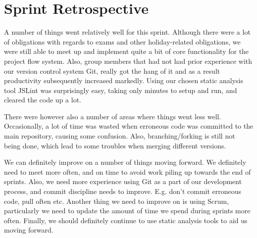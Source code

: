\section{Sprint Retrospective} %
\label{sec:Sprint Retrospective}

A number of things went relatively well for this sprint. Although there were a lot of obligations with regards to exams and other holiday-related obligations, we were still able to meet up and implement quite a bit of core functionality for the project flow system. Also, group members that had not had prior experience with our version control system Git, really got the hang of it and as a result productivity subsequently increased markedly. Using our chosen static analysis tool JSLint was surprisingly easy, taking only minutes to setup and run, and cleared the code up a lot. 

There were however also a number of areas where things went less well. Occasionally, a lot of time was wasted when erroneous code was committed to the main repository, causing some confusion. Also, branching/forking is still not being done, which lead to some troubles when merging different versions.

We can definitely improve on a number of things moving forward. We definitely need to meet more often, and on time to avoid work piling up towards the end of sprints. Also, we need more experience using Git as a part of our development process, and commit discipline needs to improve. E.g. don't commit erroneous code, pull often etc. Another thing we need to improve on is using Scrum, particularly we need to update the amount of time we spend during sprints more often. Finally, we should definitely continue to use static analysis tools to aid us moving forward. 

